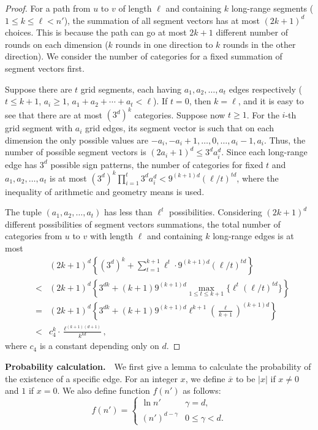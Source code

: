\documentclass[11pt]{article}
\begin{document}
\begin{proof}
For a path from $u$ to $v$ of length $\ell$ and containing $k$ long-range 
	segments ($1\leq k\leq \ell<n'$), the summation of all segment vectors has at most $(2k+1)^d$ choices. This is because the path can go at most $2k+1$ different number of rounds on each dimension ($k$ rounds in one direction to $k$ rounds in the other direction). We consider the number of categories for a fixed summation of segment vectors first.
	
	Suppose there are $t$ 
	grid segments, each having $a_1,a_2,\ldots,a_t$ edges respectively 
	($t\leq k+1$, $a_i\ge 1$, $a_1+a_2+\cdots+a_t<\ell$). 
If $t=0$, then $k=\ell$, and it is easy to see that there are at most
	$(3^d)^k $ categories.
Suppose now $t \ge 1$.
For the $i$-th grid segment with $a_i$ grid edges, its segment vector
	is such that on each dimension the only possible values 
	are $-a_i, -a_i+1, \ldots, 0, \ldots, a_i-1, a_i$.
Thus, the number of possible segment vectors is $(2a_i+1)^d \le 3^da_i^d$.
Since each long-range edge has $3^d$ possible sign patterns, 
	the number of categories for fixed $t$ and 
	$a_1,a_2,\ldots,a_t$ is at most
	$(3^d)^k\prod_{i=1}^t3^da_i^d<9^{(k+1)d}(\ell/t)^{td}$, where the
	inequality of arithmetic and geometry means is used.

The tuple $(a_1,a_2,\ldots,a_t)$ has less than $\ell^t$ possibilities. 
Considering $(2k+1)^d$ different possibilities of segment vectors summations, the total number of categories from $u$ to $v$ with length $\ell$ 
	and containing $k$ long-range edges is at most
\begin{eqnarray*}
&& (2k+1)^d\left\{(3^d)^k+\sum_{t=1}^{k+1}\ell^t\cdot9^{(k+1)d}(\ell/t)^{td}\right\} \\
& < & (2k+1)^d\left\{3^{dk}+(k+1)9^{(k+1)d}\max_{1\leq t\leq k+1}\{\ell^t(\ell/t)^{td}\}\right\} \\
& = & (2k+1)^d\left\{3^{dk}+(k+1)9^{(k+1)d}\ell^{k+1}(\frac{\ell}{k+1})^{(k+1)d}\right\} \\
& < & c_4^k\cdot\frac{\ell^{(k+1)(d+1)}}{k^{kd}},
\end{eqnarray*}
where $c_4$ is a constant depending only on $d$. 
\end{proof}

\vspace{\topsep}
\noindent
{\bf Probability calculation.}\ \ 
We first give a lemma to calculate the probability of the existence of a specific edge. For an integer $x$, we define $\overline{x}$ to be 
	$|x|$ if $x\neq 0$ and $1$ if $x=0$.
We also define function $f(n')$ as follows:
\[
f(n') = \begin{cases}
\ln n' & \gamma=d, \\
(n')^{d-\gamma} & 0\le \gamma < d.
\end{cases}
\]
\end{document}
